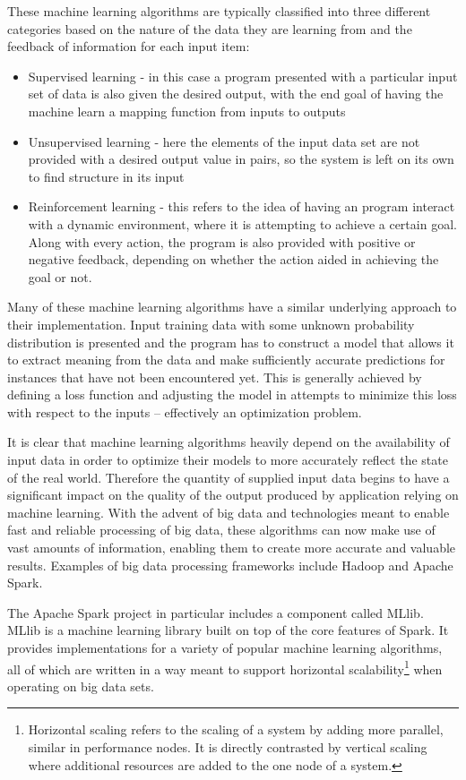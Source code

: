 \documentclass{l4proj}
\begin{document}
These machine learning algorithms are typically classified into three different categories based on the nature of the data they are learning from and the feedback of information for each input item:

\begin{itemize}
\item Supervised learning - in this case a program presented with a particular input set of data is also given the desired output, with the end goal of having the machine learn a mapping function from inputs to outputs
\item Unsupervised learning - here the elements of the input data set are not provided with a desired output value in pairs, so the system is left on its own to find structure in its input
\item Reinforcement learning - this refers to the idea of having an program interact with a dynamic environment, where it is attempting to achieve a certain goal. Along with every action, the program is also provided with positive or negative feedback, depending on whether the action aided in achieving the goal or not. 
\end{itemize}

Many of these machine learning algorithms have a similar underlying approach to their implementation. Input training data with some unknown probability distribution is presented and the program has to construct a model that allows it to extract meaning from the data and make sufficiently accurate predictions for instances that have not been encountered yet. This is generally achieved by defining a loss function and adjusting the model in attempts to minimize this loss with respect to the inputs -- effectively an optimization problem.

It is clear that machine learning algorithms heavily depend on the availability of input data in order to optimize their models to more accurately reflect the state of the real world. Therefore the quantity of supplied input data begins to have a significant impact on the quality of the output produced by application relying on machine learning. With the advent of big data and technologies meant to enable fast and reliable processing of big data, these algorithms can now make use of vast amounts of information, enabling them to create more accurate and valuable results. Examples of big data processing frameworks include Hadoop and Apache Spark.

The Apache Spark project in particular includes a component called MLlib. MLlib is a machine learning library built on top of the core features of Spark. It provides implementations for a variety of popular machine learning algorithms, all of which are written in a way meant to support horizontal scalability\footnote{Horizontal scaling refers to the scaling of a system by adding more parallel, similar in performance nodes. It is directly contrasted by vertical scaling where additional resources are added to the one node of a system.} when operating on big data sets.
\end{document}
